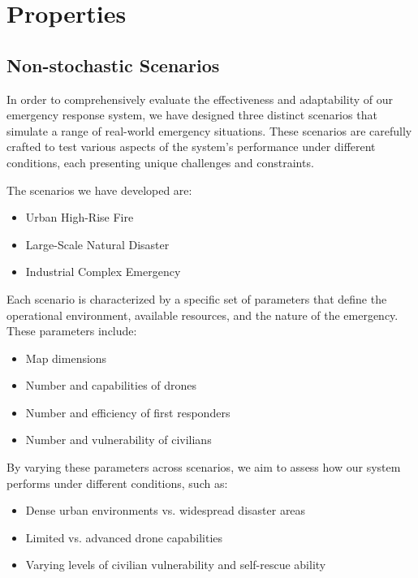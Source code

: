 
\section{Properties}

\subsection{Non-stochastic Scenarios}

In order to comprehensively evaluate the effectiveness and adaptability of our emergency response system, we have designed three distinct scenarios that simulate a range of real-world emergency situations. These scenarios are carefully crafted to test various aspects of the system's performance under different conditions, each presenting unique challenges and constraints.

The scenarios we have developed are:

\begin{itemize}
	\item Urban High-Rise Fire
	\item Large-Scale Natural Disaster
	\item Industrial Complex Emergency
\end{itemize}

Each scenario is characterized by a specific set of parameters that define the operational environment, available resources, and the nature of the emergency. These parameters include:

\begin{itemize}
	\item Map dimensions
	\item Number and capabilities of drones
	\item Number and efficiency of first responders
	\item Number and vulnerability of civilians
\end{itemize}

By varying these parameters across scenarios, we aim to assess how our system performs under different conditions, such as:

\begin{itemize}
	\item Dense urban environments vs. widespread disaster areas
	\item Limited vs. advanced drone capabilities
	\item Varying levels of civilian vulnerability and self-rescue ability
\end{itemize}

